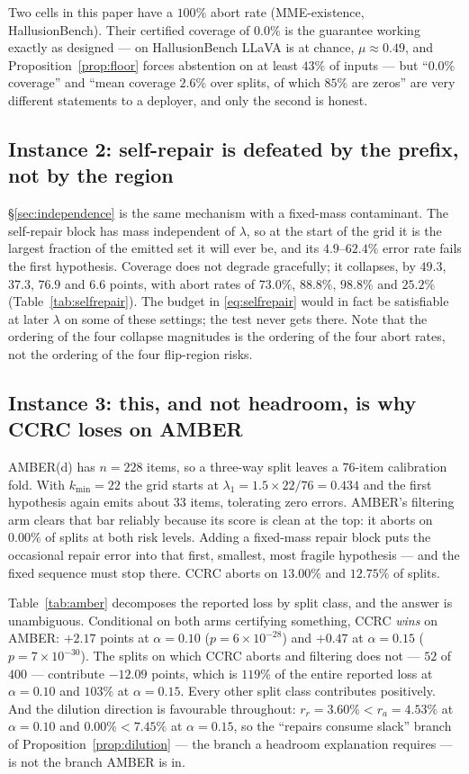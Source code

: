 \documentclass{article}
\theoremstyle{plain}
\theoremstyle{definition}
\theoremstyle{remark}
\begin{document}
Two cells in this paper have a $100\%$ abort rate (MME-existence, HallusionBench). Their
certified coverage of $0.0\%$ is the guarantee working exactly as designed --- on HallusionBench
LLaVA is at chance, $\mu\approx0.49$, and Proposition~\ref{prop:floor} forces abstention on at
least $43\%$ of inputs --- but ``$0.0\%$ coverage'' and ``mean coverage $2.6\%$ over splits, of
which $85\%$ are zeros'' are very different statements to a deployer, and only the second is
honest.

\subsection{Instance 2: self-repair is defeated by the prefix, not by the region}

\S\ref{sec:independence} is the same mechanism with a fixed-mass contaminant. The self-repair
block has mass independent of $\lambda$, so at the start of the grid it is the largest fraction
of the emitted set it will ever be, and its $4.9$--$62.4\%$ error rate fails the first hypothesis.
Coverage does not degrade gracefully; it collapses, by $49.3$, $37.3$, $76.9$ and $6.6$ points,
with abort rates of $73.0\%$, $88.8\%$, $98.8\%$ and $25.2\%$ (Table~\ref{tab:selfrepair}). The
budget in \eqref{eq:selfrepair} would in fact be satisfiable at later $\lambda$ on some of these
settings; the test never gets there. Note that the ordering of the four collapse magnitudes is
the ordering of the four abort rates, not the ordering of the four flip-region risks.

\subsection{Instance 3: this, and not headroom, is why CCRC loses on AMBER}

AMBER(d) has $n=228$ items, so a three-way split leaves a $76$-item calibration fold. With
$k_{\min}=22$ the grid starts at $\lambda_1=1.5\times22/76=0.434$ and the first hypothesis again
emits about $33$ items, tolerating zero errors. AMBER's filtering arm clears that bar reliably
because its score is clean at the top: it aborts on $0.00\%$ of splits at both risk levels.
Adding a fixed-mass repair block puts the occasional repair error into that first, smallest,
most fragile hypothesis --- and the fixed sequence must stop there. CCRC aborts on $13.00\%$ and
$12.75\%$ of splits.

Table~\ref{tab:amber} decomposes the reported loss by split class, and the answer is unambiguous.
Conditional on both arms certifying something, CCRC \emph{wins} on AMBER: $+2.17$ points at
$\alpha=0.10$ ($p=6\times10^{-28}$) and $+0.47$ at $\alpha=0.15$ ($p=7\times10^{-30}$). The
splits on which CCRC aborts and filtering does not --- $52$ of $400$ --- contribute $-12.09$
points, which is $119\%$ of the entire reported loss at $\alpha=0.10$ and $103\%$ at
$\alpha=0.15$. Every other split class contributes positively. And the dilution direction is
favourable throughout: $r_r=3.60\%<r_a=4.53\%$ at $\alpha=0.10$ and $0.00\%<7.45\%$ at
$\alpha=0.15$, so the ``repairs consume slack'' branch of Proposition~\ref{prop:dilution} ---
the branch a headroom explanation requires --- is not the branch AMBER is in.
\end{document}
